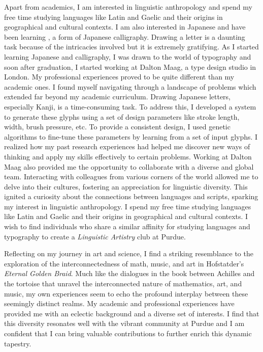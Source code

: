 \documentclass[12pt]{article}
\begin{document}
Apart from academics, I am interested in linguistic anthropology and spend my
free time studying languages like Latin and Gaelic and their origins in
geographical and cultural contexts. I am also interested in Japanese and have
been learning , a form of Japanese calligraphy. Drawing a letter is a
daunting task because of the intricacies involved but it is extremely
gratifying. As I started learning Japanese and calligraphy, I was drawn to the
world of typography and soon after graduation, I started working at Dalton Maag,
a type design studio in London. My professional experiences proved to be quite
different than my academic ones. I found myself navigating through a landscape
of problems which extended far beyond my academic curriculum. Drawing Japanese
letters, especially Kanji, is a time-consuming task. To address this, I
developed a system to generate these glyphs using a set of design parameters
like stroke length, width, brush pressure, etc. To provide a consistent design,
I used genetic algorithms to fine-tune these parameters by learning from a set
of input glyphs. I realized how my past research experiences had helped me
discover new ways of thinking and apply my skills effectively to certain
problems. Working at Dalton Maag also provided me the opportunity to collaborate
with a diverse and global team. Interacting with colleagues from various corners
of the world allowed me to delve into their cultures, fostering an appreciation
for linguistic diversity. This ignited a curiosity about the connections between
languages and scripts, sparking my interest in linguistic anthropology. I spend
my free time studying languages like Latin and Gaelic and their origins in
geographical and cultural contexts. I wish to find individuals who share a
similar affinity for studying languages and typography to create a
\textit{Linguistic Artistry} club at Purdue. 

Reflecting on my journey in art and science, I find a striking resemblance to
the exploration of the interconnectedness of math, music, and art in
Hofstatder’s \textit{Eternal Golden Braid}. Much like the dialogues in the book between
Achilles and the tortoise that unravel the interconnected nature of mathematics,
art, and music, my own experiences seem to echo the profound interplay between
these seemingly distinct realms. My academic and professional experiences have
provided me with an eclectic background and a diverse set of interests. I find
that this diversity resonates well with the vibrant community at Purdue and I am
confident that I can bring valuable contributions to further enrich this dynamic
tapestry.
\end{document}
